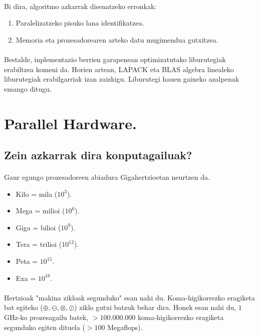 \paragraph*{}Bi dira, algoritmo azkarrak disenatzeko erronkak: 
\begin{enumerate}
\item Paralelizatzeko pisuko lana identifikatzea.
\item Memoria eta prozesadorearen arteko datu mugimendua gutxitzea. 
\end{enumerate}

\paragraph*{}Bestalde, inplementazio berrien garapenean optimizatutako liburutegiak erabiltzea komeni da. Horien artean, LAPACK eta BLAS algebra linealeko liburutegiak erabilgarriak izan zaizkigu. Liburutegi hauen gaineko azalpenak emango ditugu.

\section{Parallel Hardware.}

\subsection*{\textbf{Zein azkarrak dira konputagailuak?}}

\paragraph*{}Gaur egungo prozesadoreen abiadura Gigahertzioetan neurtzen da. 

\begin{itemize}
\item Kilo = mila ($10^3$).
\item Mega = milioi ($10^6$).
\item Giga = bilioi ($10^9$).
\item Tera = trilioi ($10^{12}$).
\item Peta = $10^{15}$.
\item Exa = $10^{18}$. 
\end{itemize}

\paragraph*{} Hertzioak "makina zikloak segunduko" esan nahi du. Koma-higikorrezko  eragiketa bat egiteko ($\oplus,\ominus,\otimes,\oslash$) ziklo gutxi batzuk behar dira. Honek esan nahi du, $1$GHz-ko prozesagailu batek,
$>100.000.000$ koma-higikorrezko eragiketa segunduko egiten dituela ($>100$ Megaflops).

